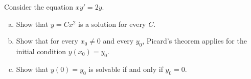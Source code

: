 \begin{exercise}
Consider the equation $x y' = 2y$.
\begin{enumerate}[a)]
\item
Show that $y = Cx^2$ is a solution for every $C$.
\item
Show that for every $x_0 \not= 0$ and every $y_0$, Picard's
theorem applies for the initial condition $y(x_0) = y_0$.
\item
Show that $y(0) = y_0$ is solvable if and only if $y_0 = 0$.
\end{enumerate}
\end{exercise}
